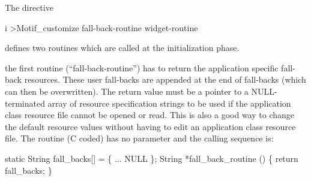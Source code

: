 The \CDF{} directive
\begin{Gray}{i}
>Motif_customize  fall-back-routine  widget-routine
\end{Gray}
defines two routines
which are called at the initialization phase.
\begin{UL}
\item
the first routine (``fall-back-routine'') has to return the application
specific fall-back resources. These user fall-backs are appended
at the end of \KUIP{} fall-backs (which can then be overwritten).
The return value must be a pointer to a NULL-terminated array of 
resource specification
strings to be used if the application class resource file cannot be opened
or read. This is also a good way to change the default resource values
without having to edit an application class resource file.
\hfill\break
The routine (C coded) has no parameter and the calling sequence is:
\begin{XMP}
static String fall_backs[] = \{
 ...
 NULL
\};
String *fall_back_routine ()
\{
   return fall_backs;
\}
\end{XMP}
 

\end{UL}
